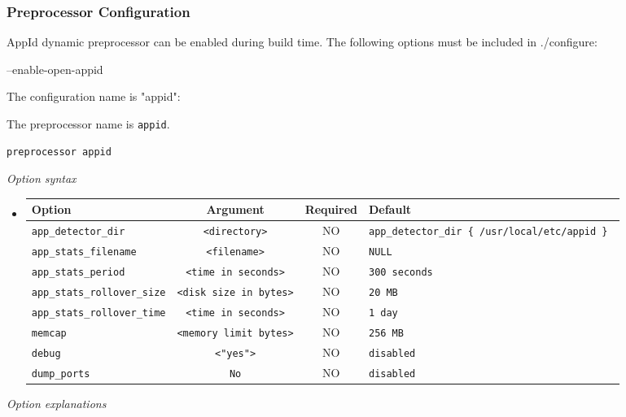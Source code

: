 \documentclass[english]{report}
\begin{document}
\subsubsection{Preprocessor Configuration}
AppId dynamic preprocessor can be enabled during build time. The
following options must be included in ./configure:

--enable-open-appid

The configuration name is "appid":

The preprocessor name is \texttt{appid}.
\begin{verbatim}
preprocessor appid
\end{verbatim}
\textit{Option syntax}
\begin{itemize}
\item[]
\begin{tabular}{|l|c|c|p{6cm}|}
\hline
Option & Argument & Required & Default\\
\hline
\hline
\texttt{app\_detector\_dir} & \texttt{<directory>} & NO & \texttt{app\_detector\_dir \{ /usr/local/etc/appid \} }\\
\texttt{app\_stats\_filename} & \texttt{<filename>} & NO & \texttt{NULL}\\
\texttt{app\_stats\_period} & \texttt{<time in seconds>} & NO & \texttt{300 seconds}\\
\texttt{app\_stats\_rollover\_size} & \texttt{<disk size in bytes>} & NO & \texttt{20 MB}\\
\texttt{app\_stats\_rollover\_time} & \texttt{<time in seconds>} & NO & \texttt{1 day}\\
\texttt{memcap} & \texttt{<memory limit bytes>} & NO & \texttt{256 MB}\\
\texttt{debug} & \texttt{<"yes">} & NO & \texttt{disabled}\\
\texttt{dump\_ports} & \texttt{No} & NO & \texttt{disabled}\\
\hline
\end{tabular}
\end{itemize}
\normalsize
\textit{Option explanations}
\end{document}
